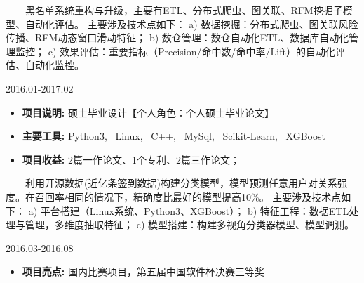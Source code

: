 \documentclass{resume}
\begin{document}
{\begin{itemize} [parsep=0.5ex]
\end{itemize}


{  \ \ \ \ 黑名单系统重构与升级，主要有ETL、分布式爬虫、图关联、RFM挖掘子模型、自动化评估。
主要涉及技术点如下：
a) 数据挖掘：分布式爬虫、图关联风险传播、RFM动态窗口滑动特征；
b) 数仓管理：数仓自动化ETL、数据库自动化管理监控；
c) 效果评估：重要指标（Precision/命中数/命中率/Lift）的自动化评估、自动化监控。}

\medskip















                   {2016.01-2017.02}

\begin{itemize} [parsep=0.5ex]

\item   \textbf{ 项目说明: }   {硕士毕业设计【个人角色：个人硕士毕业论文】}
\item   \textbf{ 主要工具: }  { Python3,  \ Linux,  \ C++,  \ MySql,  \ Scikit-Learn,  \ XGBoost }
\item   \textbf{ 项目收益: }  { 2篇一作论文、1个专利、2篇三作论文； }

\end{itemize}


{ \ \ \ \ 利用开源数据(近亿条签到数据)构建分类模型，模型预测任意用户对关系强度。在召回率相同的情况下，精确度比最好的模型提高10\%。
主要涉及技术点如下：
a) 平台搭建（Linux系统、Python3、XGBoost）；
b) 特征工程：数据ETL处理与管理，多维度抽取特征；
c) 模型搭建：构建多视角分类器模型、模型调测。
}

\medskip










                                                             {2016.03-2016.08}

\begin{itemize} [parsep=0.5ex]

  \item   \textbf{ 项目亮点: }  { 国内比赛项目，第五届中国软件杯决赛三等奖 }
  
\end{itemize}

}
\end{document}

